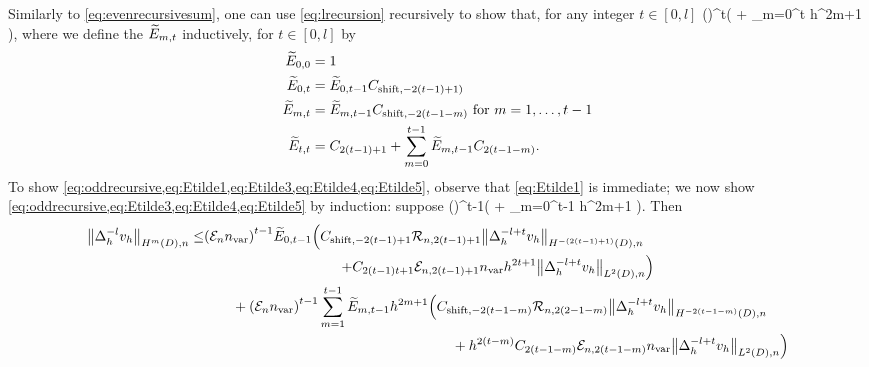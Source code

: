 Similarly to \cref{eq:evenrecursivesum}, one can use \cref{eq:lrecursion} recursively to show that, for any integer $t \in [0,l]$
\beq\label{eq:oddrecursive}
 \leq \mleft(\En \nvar\mright)^t\mleft(  + \sum_{m=0}^t  h^{2m+1}  \mright),
\eeq
where  we define the $\widetilde{E}_{m,t}$ inductively, for $t \in [0,l]$ by
\begin{align}
\label{eq:Etilde1}\widetilde{E}_{0,0} &= 1\\
\label{eq:Etilde3}\widetilde{E}_{0,t} &= \widetilde{E}_{0,t-1}C_{\mathrm{shift},-2(t-1)+1)}\\
\label{eq:Etilde4}\widetilde{E}_{m,t} &= \widetilde{E}_{m,t-1}C_{\mathrm{shift},-2(t-1-m)}\text{ for } m = 1,\ldots,t-1\\
\label{eq:Etilde5}\widetilde{E}_{t,t} &= C_{2(t-1)+1} + \sum_{m=0}^{t-1}\widetilde{E}_{m,t-1}C_{2(t-1-m)}.\\
\end{align}
To show \cref{eq:oddrecursive,eq:Etilde1,eq:Etilde3,eq:Etilde4,eq:Etilde5}, observe that \cref{eq:Etilde1} is immediate; we now show \cref{eq:oddrecursive,eq:Etilde3,eq:Etilde4,eq:Etilde5} by induction: suppose %
\beqs
{} \leq \mleft(\En \nvar\mright)^{t-1}\mleft(  + \sum_{m=0}^{t-1}  h^{2m+1}  \mright).
\eeqs
Then
\begin{align*}
\NHnfn{m}{D}{\Deltah^{-l}\vh} \leq& \mleft(\En \nvar\mright)^{t-1} \Etildefn{0,t-1} \mleft(\Cshiftfn{2(t-1)+1} \shiftn{2(t-1)+1}\NHnfn{-(2(t-1)+1)}{D}{\Deltah^{-l + t}\vh}\mright.\\
&\hphantom{\mleft(\En \nvar\mright)^{t-1} \Etildefn{0,t-1}}\quad\quad\mleft.+\Cfn{2(t-1)t+1} \errn{2(t-1)+1}\nvar h^{2t+1} \NLtDn{\Deltah^{-l + t}\vh}\mright)\\
&\quad\quad+ \mleft(\En \nvar\mright)^{t-1}\sum_{m=1}^{t-1} \Etildefn{m,t-1} h^{2m+1} \mleft(\Cshiftfn{2(t-1-m)} \shiftn{2(2-1-m)}\NHnfn{-2(t-1-m)}{D}{\Deltah^{-l + t}\vh}\mright.\\
&\mleft.\hphantom{\quad\quad+ \mleft(\En \nvar\mright)^{t-1}\sum_{m=1}^{t-1} \Etildefn{m,t-1} h^{2m+1}}\quad\quad+ h^{2(t-m)} \Cfn{2(t-1-m)}\errn{2(t-1-m)}\nvar \NLtDn{\Deltah^{-l + t}\vh}\mright)\\
\end{align*}
